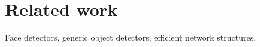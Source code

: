 \section{Related work}
\label{sec:related_work}

Face detectors, generic object detectors, efficient network structures. 